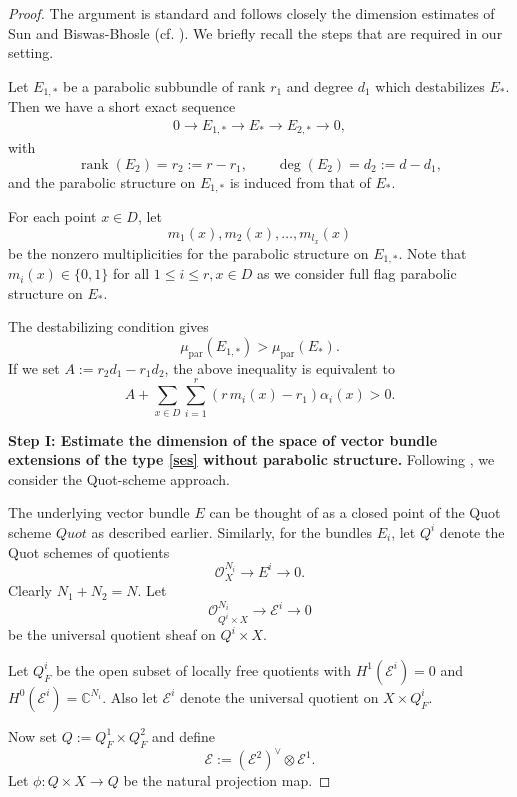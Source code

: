 \documentclass[11pt, reqno]{amsart}
\numberwithin{equation}{section}
\DeclareMathOperator{\rank}{rank}
\theoremstyle{definition}
\begin{document}
\begin{proof}
The argument is standard and follows closely the dimension estimates of Sun and Biswas-Bhosle (cf. \cite{S00, BB23}). We briefly recall the steps that are required in our setting.

Let $E_{1,*}$ be a parabolic subbundle of rank $r_1$ and degree $d_1$ which destabilizes $E_*$. Then we have a short exact sequence
\begin{align}\label{ses}
0 \to E_{1,*} \to E_* \to E_{2,*} \to 0,
\end{align}
with
\[
\rank(E_2)=r_2:= r-r_1,\qquad \deg(E_2)=d_2:=d-d_1,
\]
and the parabolic structure on $E_{1,*}$ is induced from that of $E_*$. 

For each point $x \in D$, let 
\[
m_1(x), m_2(x), \ldots , m_{l_x}(x)
\]
be the nonzero multiplicities for the parabolic structure on $E_{1,*}$. Note that $m_i(x) \in \{0,1\}$ for all $1\le i \le r, x \in D$ as we consider full flag parabolic structure on $E_*$. 

The destabilizing condition gives
\[
\mu_{\mathrm{par}}(E_{1,*})>\mu_{\mathrm{par}}(E_*).
\]
If we set $A:=r_2d_1-r_1d_2$, the above inequality is equivalent to
\begin{equation}\label{eq:destab}
A+\sum_{x\in D}\sum_{i=1}^r (r\,m_i(x)-r_1)\alpha_i(x)>0.
\end{equation}

\noindent \textbf{Step I: Estimate the dimension of the space of vector bundle extensions of the type \eqref{ses} without parabolic structure.} Following \cite{BB23, S00}, we consider the Quot-scheme approach.

The underlying vector bundle $E$ can be thought of as a closed point of the Quot scheme $Quot$ as described earlier. Similarly, for the bundles $E_i$, let $Q^i$ denote the Quot schemes of quotients
\[
\mathcal{O}_X^{N_i} \longrightarrow E^i \longrightarrow 0.
\]
Clearly $N_1+N_2=N$. Let
\[
\mathcal{O}^{N_i}_{Q^i \times X} \longrightarrow \mathcal{E}^i \longrightarrow 0
\]
be the universal quotient sheaf on $Q^i \times X$.

Let $Q^i_F$ be the open subset of locally free quotients with $H^1(\mathcal{E}^i)=0$ and $H^0(\mathcal{E}^i)=\mathbb{C}^{N_i}$. Also let $\mathcal{E}^i$ denote the universal quotient on $X \times Q^i_F$.

Now set $Q:= Q_F^1 \times Q_F^2$ and define
\[
\mathcal{E}:= (\mathcal{E}^2)^{\vee} \otimes \mathcal{E}^1.
\]
Let $\phi: Q \times X \longrightarrow Q$ be the natural projection map.


\end{proof}
\end{document}
